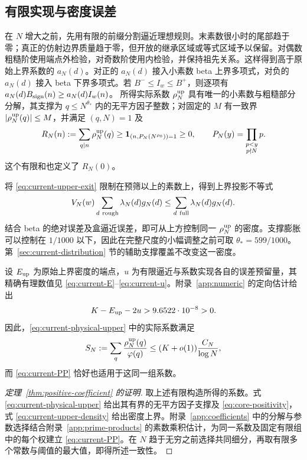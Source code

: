 \subsection{有限实现与密度误差}

在 $N$ 增大之前，先用有限的前缀分割逼近理想规则。末素数很小时的尾部趋于零；真正的仿射边界质量趋于零，但开放的继承区域或等式区域予以保留。对偶数粗糙阶使用端点外检验，对奇数阶使用内检验，并保持祖先关系。这样得到高于原始上界系数的 $a_N(d)$。对正的 $a_N(d)$ 接入小素数 beta 上界多项式，对负的 $a_N(d)$ 接入 beta 下界多项式。若 $B^-\le I_w\le B^+$，则逐项有 $a_N(d)B_{\rm sign}(n)\ge a_N(d)I_w(n)$。
所得实际系数 $\rho_N^{\rm up}$ 具有唯一的小素数与粗糙部分分解，其支撑为 $q\le N^{\theta_*}$ 内的无平方因子整数；对固定的 $M$ 有一致界 $|\rho_N^{\rm up}(q)|\le M$，并满足 $(q,N)=1$ 及
\begin{equation}
 R_N(n):=\sum_{q\mid n}\rho_N^{\rm up}(q)
   \ge {\mathbf 1}_{(n,P_N(N^{\rho_0}))=1}\ge0,
 \qquad P_N(y)=\prod_{\substack{p<y\\p\nmid N}}p.
 \label{eq:current-physical-upper}
\end{equation}
这个有限和也定义了 $R_N(0)$。

将 \eqref{eq:current-upper-exit} 限制在预筛以上的素数上，得到上界投影不等式
\[
 V_N(w)\sum_{d\ {\rm rough}}\lambda_N(d)g_N(d)
       \le\sum_{d\ {\rm full}}\lambda_N(d)g_N(d).
\]
结合 beta 的绝对误差及盒逼近误差，即可从上方控制同一 $\rho_N^{\rm up}$ 的密度。支撑膨胀可以控制在 $1/1000$ 以下，因此在完整尺度的小幅调整之前可取 $\theta_*=599/1000$。第~\ref{sec:current-distribution} 节的辅助支撑覆盖不改变这一密度。

设 $E_{\rm up}$ 为原始上界密度的端点，$u$ 为有限逼近与系数实现各自的误差预留量，其精确有理数值见 \eqref{eq:current-E}--\eqref{eq:current-u}。附录~\ref{app:numeric} 的定向估计给出
\begin{equation}
                     K-E_{\rm up}-2u>9.6522\cdot10^{-8}>0.
                     \label{eq:current-upper-slack}
\end{equation}
因此，\eqref{eq:current-physical-upper} 中的实际系数满足
\begin{equation}
 S_N:=\sum_q\frac{\rho_N^{\rm up}(q)}{\varphi(q)}
       \le(K+o(1))\frac{C_N}{\log N},
 \label{eq:current-upper-density}
\end{equation}
而 \eqref{eq:current-PP} 恰好也适用于这同一组系数。

\begin{proof}[定理~\ref{thm:positive-coefficient} 的证明]
取上述有限构造所得的系数。式 \eqref{eq:current-physical-upper} 给出其有界的无平方因子支撑及 \eqref{eq:core-positivity}，式 \eqref{eq:current-upper-density} 给出密度上界。附录~\ref{app:coefficients} 中的分解与参数选择结合附录~\ref{app:prime-products} 的素数乘积估计，为同一系数及固定有限组中的每个权建立 \eqref{eq:current-PP}。在 $N$ 趋于无穷之前选择共同细分，再取有限多个常数与阈值的最大值，即得所述一致性。
\end{proof}

